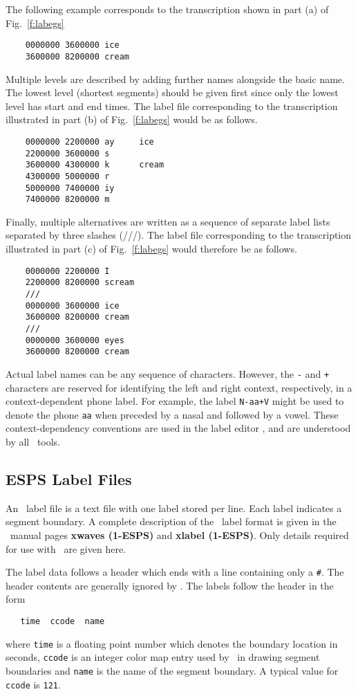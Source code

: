 The following example corresponds to the transcription shown
in part (a) of Fig.~\ref{f:labegs}
\begin{verbatim}
    0000000 3600000 ice
    3600000 8200000 cream
\end{verbatim}
Multiple levels are described by adding further names alongside
the basic name.  The lowest level (shortest segments) should be
given first since only the lowest level has start and end times.
The label file corresponding to the transcription illustrated in
part (b) of Fig.~\ref{f:labegs} would be as follows.
\begin{verbatim}
    0000000 2200000 ay     ice
    2200000 3600000 s
    3600000 4300000 k      cream
    4300000 5000000 r
    5000000 7400000 iy
    7400000 8200000 m
\end{verbatim}
Finally, multiple alternatives are written as a sequence of separate
label lists separated by three slashes (///).
The label file corresponding to the transcription illustrated in
part (c) of Fig.~\ref{f:labegs} would therefore be as follows.
\begin{verbatim}
    0000000 2200000 I
    2200000 8200000 scream
    ///
    0000000 3600000 ice
    3600000 8200000 cream
    ///
    0000000 3600000 eyes
    3600000 8200000 cream
\end{verbatim}

Actual label names can be any sequence of characters.
However, the \texttt{-} and \texttt{+} characters are reserved for identifying
the left and right context, 
respectively, in a context-dependent phone
label.  For example, the label \texttt{N-aa+V} might be used to denote
the phone \texttt{aa} when preceded by a nasal and followed by a vowel.
These context-dependency conventions are used in the label editor ,
and are understood by all \HTK\ tools.

\subsection{ESPS Label Files}

An \ESPSwaves\  label file is a text file with one label stored per
line. Each label indicates a segment boundary. 
A complete description
of the \ESPSwaves\  label format is given in the \ESPSwaves\ 
manual pages {\bf xwaves (1-ESPS)} and {\bf xlabel (1-ESPS)}.
Only details required for use with \HTK\ are given here. 

The label data follows
a header which ends with a line containing only
a \texttt{\#}.  The header contents are generally ignored by .
The labels follow the header in the form
\begin{verbatim}
   time  ccode  name 
\end{verbatim}
where \texttt{time} is a floating point number which denotes the boundary
location  in seconds,
\texttt{ccode} is an integer color map entry used by \ESPSwaves\  in drawing
segment boundaries and \texttt{name} is the name of the segment boundary. A
typical value for \texttt{ccode} is \texttt{121}.

